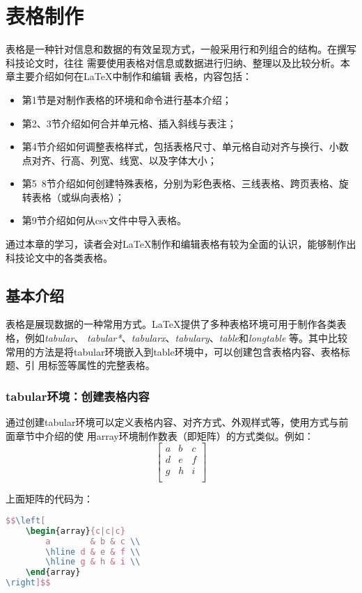 \chapter{表格制作}
表格是一种针对信息和数据的有效呈现方式，一般采用行和列组合的结构。在撰写科技论文时，往往
需要使用表格对信息或数据进行归纳、整理以及比较分析。本章主要介绍如何在LaTeX中制作和编辑
表格，内容包括：
\begin{itemize}
    \item 第1节是对制作表格的环境和命令进行基本介绍；
    \item 第2、3节介绍如何合并单元格、插入斜线与表注；
    \item 第4节介绍如何调整表格样式，包括表格尺寸、单元格自动对齐与换行、小数点对齐、行高、列宽、线宽、以及字体大小；
    \item 第5~8节介绍如何创建特殊表格，分别为彩色表格、三线表格、跨页表格、旋转表格（或纵向表格）；
    \item 第9节介绍如何从csv文件中导入表格。
\end{itemize}

通过本章的学习，读者会对LaTeX制作和编辑表格有较为全面的认识，能够制作出科技论文中的各类表格。

\section{基本介绍}
表格是展现数据的一种常用方式。LaTeX提供了多种表格环境可用于制作各类表格，例如\emph{tabular}、
\emph{tabular*}、\emph{tabularx}、\emph{tabulary}、\emph{table}和\emph{longtable}
等。其中比较常用的方法是将tabular环境嵌入到table环境中，可以创建包含表格内容、表格标题、引
用标签等属性的完整表格。

\subsection{tabular环境：创建表格内容}
通过创建tabular环境可以定义表格内容、对齐方式、外观样式等，使用方式与前面章节中介绍的使
用array环境制作数表（即矩阵）的方式类似。例如：
$$\left[
        \begin{array}{c|c|c}
            a        & b & c \\
            \hline d & e & f \\
            \hline g & h & i \\
        \end{array}
        \right]$$

上面矩阵的代码为：
\begin{lstlisting}[language=TeX]
$$\left[
    \begin{array}{c|c|c}
        a        & b & c \\
        \hline d & e & f \\
        \hline g & h & i \\
    \end{array}
\right]$$
\end{lstlisting}

